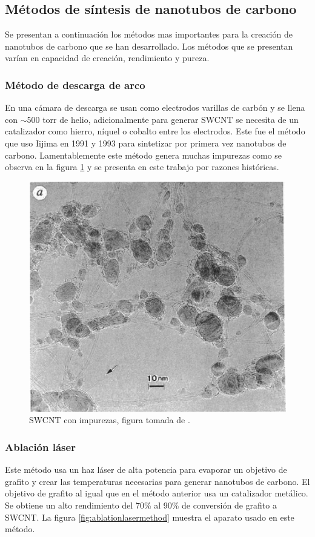 
\subsection{Métodos de síntesis de nanotubos de carbono}

Se presentan a continuación los métodos mas importantes para la creación de nanotubos de carbono que se han desarrollado. Los métodos que se presentan varían en capacidad de creación, rendimiento y pureza.

\subsubsection{Método de descarga de arco}

En una cámara de descarga se usan como electrodos varillas de carbón y se llena con $\sim$500 torr de helio, adicionalmente para generar SWCNT se necesita de un catalizador como hierro, níquel o cobalto entre los electrodos. Este fue el método que uso Iijima en 1991 y 1993 para sintetizar por primera vez nanotubos de carbono. Lamentablemente este método genera muchas impurezas como se observa en la figura \ref{fig:arcmethod} y se presenta en este trabajo por razones históricas.

\begin{figure}[!h]
    \centering
    \includegraphics[width=.4\textwidth,keepaspectratio=true]{CNT/arcmethod.png}
    \caption{SWCNT con impurezas, figura tomada de \cite{Iijima1993}.}
    \label{fig:arcmethod}
\end{figure}

\newpage

\subsubsection{Ablación láser}

Este método usa un haz láser de alta potencia para evaporar un objetivo de grafito y crear las temperaturas necesarias para generar nanotubos de carbono. El objetivo de grafito al igual que en el método anterior usa un catalizador metálico. Se obtiene un alto rendimiento del 70\% al 90\% de conversión de grafito a SWCNT. La figura \ref{fig:ablationlasermethod} muestra el aparato usado en este método.

